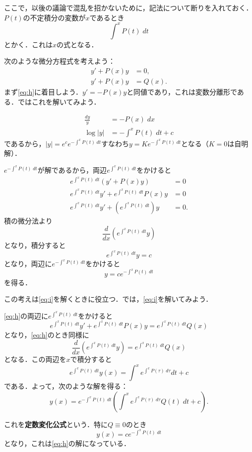 ここで，以後の議論で混乱を招かないために，記法について断りを入れておく．$P(t)$の不定積分の変数が$x$であるとき
\[ \int^{x} P(t) \; dt\]
とかく．これは$x$の式となる．

次のような微分方程式を考えよう：
\begin{align}
    y'+P(x)y &= 0, \label{eq:h} \\
    y'+P(x)y &= Q(x). \label{eq:i}
\end{align}
まず\eqref{eq:h}に着目しよう．$y'=-P(x)y$と同値であり，これは変数分離形である．ではこれを解いてみよう．

\begin{align*}
    \frac{dy}{y} &= -P(x) \; dx \\
    \log|y| &= - \int^{x} P(t) \; dt + c 
\end{align*}
であるから，$|y|=e^ce^{-\int^{x} P(t) \; dt}$すなわち$y=Ke^{-\int^{x} P(t) \; dt}$となる（$K=0$は自明解）．

$e^{-\int^{x} P(t) \; dt}$が解であるから，両辺$e^{\int^{x} P(t) \; dt}$をかけると
\begin{align*}
    e^{\int^{x} P(t) \; dt}(y'+P(x)y) &= 0 \\
    e^{\int^{x} P(t) \; dt}y' + e^{\int^{x} P(t) \; dt} P(x)y &= 0 \\
    e^{\int^{x} P(t) \; dt}y' + \left(e^{\int^{x} P(t) \; dt}\right) y &= 0.
\end{align*}
積の微分法より
\[ \frac{d}{dx} \left(e^{\int^{x} P(t) \; dt}y\right)\]
となり，積分すると
\[ e^{\int^{x} P(t) \; dt}y = c\]
となり，両辺に$e^{-\int^{x} P(t) \; dt}$をかけると
\[ y = ce^{-\int^{x} P(t) \; dt}\]
を得る．

この考えは\eqref{eq:i}を解くときに役立つ．では，\eqref{eq:i}を解いてみよう．

\eqref{eq:h}の両辺に$e^{\int^{x} P(t) \; dt}$をかけると
\[ e^{\int^{x} P(t) \; dt}y' + e^{\int^{x} P(t) \; dt} P(x)y = e^{\int^{x} P(t) \; dt} Q(x)\]
となり，\eqref{eq:h}のとき同様に
\[ \frac{d}{dx} \left(e^{\int^{x} P(t) \; dt} y\right) = e^{\int^{x} P(t) \; dt} Q(x)\]
となる．この両辺を$x$で積分すると
\[ e^{\int^{x} P(t) \; dt} y(x) = \int^x e^{\int^{x} P(\tau) \; d\tau} dt + c\]
である．よって，次のような解を得る：
\begin{equation}
    y(x) = e^{-\int^{x} P(t) \; dt} \left( \int^x e^{\int^{x} P(\tau) \; d\tau} Q(t) \; dt +c \right).
\end{equation}

これを\textbf{定数変化公式}という．特に$Q \equiv 0$のとき
\[ y(x) = ce^{-\int^{x} P(t) \; dt}\]
となり，これは\eqref{eq:h}の解になっている．

